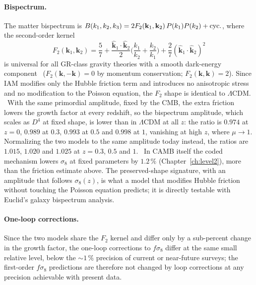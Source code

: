 \paragraph{Bispectrum.} The matter bispectrum is $B(k_1,k_2,k_3)=2F_2(\mathbf k_1,\mathbf k_2)\,P(k_1)P(k_2)+{\rm cyc.}$, where the second-order kernel
\begin{equation}F_2(\mathbf k_1,\mathbf k_2)=\frac57+\frac{\hat{\mathbf k}_1\cdot\hat{\mathbf k}_2}{2}\Big(\frac{k_1}{k_2}+\frac{k_2}{k_1}\Big)+\frac27(\hat{\mathbf k}_1\cdot\hat{\mathbf k}_2)^2\label{eq:th:F2}\end{equation}
is universal for all GR-class gravity theories with a smooth dark-energy component~\cite{Bernardeau2002} ($F_2(\mathbf k,-\mathbf k)=0$ by momentum conservation;
$F_2(\mathbf k,\mathbf k)=2$). Since IAM modifies only the Hubble friction term and introduces no anisotropic stress and no modification to the Poisson
equation, the $F_2$ shape is identical to $\Lambda$CDM. \derived\ With the same primordial amplitude, fixed by the CMB, the extra friction lowers the
growth factor at every redshift, so the bispectrum amplitude, which scales as $D^4$ at fixed shape, is lower than in $\Lambda$CDM at all $z$: the ratio
is $0.974$ at $z=0$, $0.989$ at $0.3$, $0.993$ at $0.5$ and $0.998$ at $1$, vanishing at high $z$, where $\mu\to1$. Normalizing the two models to the same
amplitude today instead, the ratios are $1.015$, $1.020$ and $1.025$ at $z=0.3$, $0.5$ and $1$. \calc\ In CAMB itself the coded mechanism lowers $\sigma_8$
at fixed parameters by $1.2\,\%$ (Chapter~\ref{ch:level2}), more than the friction estimate above. The preserved-shape signature, with an amplitude that
follows $\sigma_8(z)$, is what a model that modifies Hubble friction without touching the Poisson equation predicts; it is directly testable with Euclid's
galaxy bispectrum analysis. \prediction

\paragraph{One-loop corrections.} Since the two models share the $F_2$ kernel and differ only by a sub-percent change in the growth factor, the
one-loop corrections to $f\sigma_8$ differ at the same small relative level, below the $\sim1\,\%$ precision of current or near-future surveys; the
first-order $f\sigma_8$ predictions are therefore not changed by loop corrections at any precision achievable with present data. \derived


